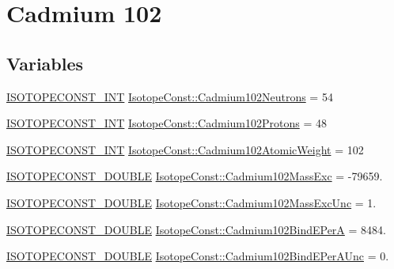 \hypertarget{group___isotope_const-_cadmium-_cd102}{}\section{Cadmium 102}
\label{group___isotope_const-_cadmium-_cd102}
\subsection*{Variables}
\begin{DoxyCompactItemize}
\item 
\mbox{\hyperlink{group___isotope_const-_macros_ga5f18360b3e99483a35c32d789e62621c}{I\+S\+O\+T\+O\+P\+E\+C\+O\+N\+S\+T\+\_\+\+I\+NT}} \mbox{\hyperlink{group___isotope_const-_cadmium-_cd102_gaec4e9d204b10ede7ff4454101e4e629f}{Isotope\+Const\+::\+Cadmium102\+Neutrons}} = 54
\item 
\mbox{\hyperlink{group___isotope_const-_macros_ga5f18360b3e99483a35c32d789e62621c}{I\+S\+O\+T\+O\+P\+E\+C\+O\+N\+S\+T\+\_\+\+I\+NT}} \mbox{\hyperlink{group___isotope_const-_cadmium-_cd102_gab3aa2d468404c97c81d82ddd12b2c740}{Isotope\+Const\+::\+Cadmium102\+Protons}} = 48
\item 
\mbox{\hyperlink{group___isotope_const-_macros_ga5f18360b3e99483a35c32d789e62621c}{I\+S\+O\+T\+O\+P\+E\+C\+O\+N\+S\+T\+\_\+\+I\+NT}} \mbox{\hyperlink{group___isotope_const-_cadmium-_cd102_gaca90a50c837a783a026798d5537aab2c}{Isotope\+Const\+::\+Cadmium102\+Atomic\+Weight}} = 102
\item 
\mbox{\hyperlink{group___isotope_const-_macros_ga8f45a7272ce02c0b4c65c44636ed719a}{I\+S\+O\+T\+O\+P\+E\+C\+O\+N\+S\+T\+\_\+\+D\+O\+U\+B\+LE}} \mbox{\hyperlink{group___isotope_const-_cadmium-_cd102_ga824af4a70076d8042b5928be8553f432}{Isotope\+Const\+::\+Cadmium102\+Mass\+Exc}} = -\/79659.
\item 
\mbox{\hyperlink{group___isotope_const-_macros_ga8f45a7272ce02c0b4c65c44636ed719a}{I\+S\+O\+T\+O\+P\+E\+C\+O\+N\+S\+T\+\_\+\+D\+O\+U\+B\+LE}} \mbox{\hyperlink{group___isotope_const-_cadmium-_cd102_ga0b0c8330904284d3cbaa4e57b161d1e6}{Isotope\+Const\+::\+Cadmium102\+Mass\+Exc\+Unc}} = 1.
\item 
\mbox{\hyperlink{group___isotope_const-_macros_ga8f45a7272ce02c0b4c65c44636ed719a}{I\+S\+O\+T\+O\+P\+E\+C\+O\+N\+S\+T\+\_\+\+D\+O\+U\+B\+LE}} \mbox{\hyperlink{group___isotope_const-_cadmium-_cd102_gacb368b4004a78bbb100c35d3b33e02ad}{Isotope\+Const\+::\+Cadmium102\+Bind\+E\+PerA}} = 8484.
\item 
\mbox{\hyperlink{group___isotope_const-_macros_ga8f45a7272ce02c0b4c65c44636ed719a}{I\+S\+O\+T\+O\+P\+E\+C\+O\+N\+S\+T\+\_\+\+D\+O\+U\+B\+LE}} \mbox{\hyperlink{group___isotope_const-_cadmium-_cd102_gaa846fe92e7258bc11f6559a62783eb55}{Isotope\+Const\+::\+Cadmium102\+Bind\+E\+Per\+A\+Unc}} = 0.

\end{DoxyCompactItemize}
